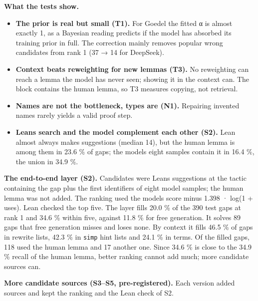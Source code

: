 \documentclass[11pt,a4paper]{article}
\providecommand{\tightlist}{\setlength{\itemsep}{0pt}\setlength{\parskip}{0pt}}
\begin{document}
\textbf{What the tests show.}

\begin{itemize}
\tightlist
\item
  \textbf{The prior is real but small (T1).} For Goedel the fitted α is almost exactly 1, as a Bayesian reading predicts if the model has absorbed its training prior in full. The correction mainly removes popular wrong candidates from rank 1 (37 → 14 for DeepSeek).
\item
  \textbf{Context beats reweighting for new lemmas (T3).} No reweighting can reach a lemma the model has never seen; showing it in the context can. The block contains the human lemma, so T3 measures copying, not retrieval.
\item
  \textbf{Names are not the bottleneck, types are (N1).} Repairing invented names rarely yields a valid proof step.
\item
  \textbf{Lean\textquotesingle s search and the model complement each other (S2).} Lean almost always makes suggestions (median 14), but the human lemma is among them in 23.6 \% of gaps; the model\textquotesingle s eight samples contain it in 16.4 \%, the union in 34.9 \%.
\end{itemize}

\textbf{The end-to-end layer (S2).} Candidates were Lean\textquotesingle s suggestions at the tactic containing the gap plus the first identifiers of eight model samples; the human lemma was not added. The ranking used the model\textquotesingle s score minus 1.398 · log(1 + uses). Lean checked the top five. The layer fills 20.0 \% of the 390 test gaps at rank 1 and 34.6 \% within five, against 11.8 \% for free generation. It solves 89 gaps that free generation misses and loses none. By context it fills 46.5 \% of gaps in rewrite lists, 42.3 \% in \texttt{simp} hint lists and 24.1 \% in terms. Of the filled gaps, 118 used the human lemma and 17 another one. Since 34.6 \% is close to the 34.9 \% recall of the human lemma, better ranking cannot add much; more candidate sources can.

\textbf{More candidate sources (S3--S5, pre-registered).} Each version added sources and kept the ranking and the Lean check of S2.
\end{document}
